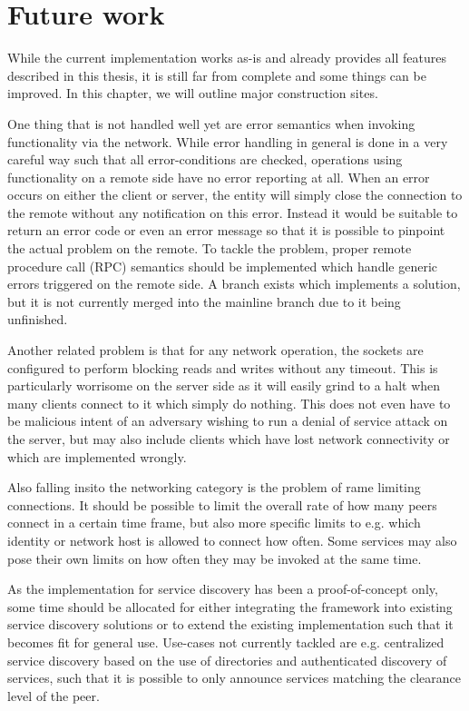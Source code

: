 \chapter{Future work}

While the current implementation works as-is and already provides all features described in this thesis, it is still far from complete and some things can be improved.
In this chapter, we will outline major construction sites.

One thing that is not handled well yet are error semantics when invoking functionality via the network.
While error handling in general is done in a very careful way such that all error-conditions are checked, operations using functionality on a remote side have no error reporting at all.
When an error occurs on either the client or server, the entity will simply close the connection to the remote without any notification on this error.
Instead it would be suitable to return an error code or even an error message so that it is possible to pinpoint the actual problem on the remote.
To tackle the problem, proper remote procedure call (RPC) semantics should be implemented which handle generic errors triggered on the remote side.
A branch exists which implements a solution, but it is not currently merged into the mainline branch due to it being unfinished.

Another related problem is that for any network operation, the sockets are configured to perform blocking reads and writes without any timeout.
This is particularly worrisome on the server side as it will easily grind to a halt when many clients connect to it which simply do nothing.
This does not even have to be malicious intent of an adversary wishing to run a denial of service attack on the server, but may also include clients which have lost network connectivity or which are implemented wrongly.

Also falling insito the networking category is the problem of rame limiting connections.
It should be possible to limit the overall rate of how many peers connect in a certain time frame, but also more specific limits to e.g. which identity or network host is allowed to connect how often.
Some services may also pose their own limits on how often they may be invoked at the same time.

As the implementation for service discovery has been a proof-of-concept only, some time should be allocated for either integrating the framework into existing service discovery solutions or to extend the existing implementation such that it becomes fit for general use.
Use-cases not currently tackled are e.g. centralized service discovery based on the use of directories and authenticated discovery of services, such that it is possible to only announce services matching the clearance level of the peer.

